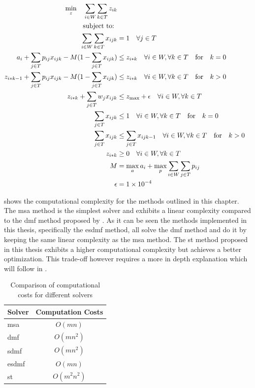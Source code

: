 \documentclass[draft=false]{seal_thesis}
\begin{document}
\begin{align}
    \min_z \quad \sum_{i \in W} \sum_{k \in T} z_{ik}\\
    \text{subject to: } \notag \\
    \sum_{i \in W} \sum_{k \in T} x_{ijk} &= 1 \quad \forall j \in T\\
    a_i + \sum_{j \in T} p_{ij} x_{ijk} - M(1 - \sum_{j \in T} x_{ijk}) &\leq z_{i*k} \quad \forall i \in W, \forall k \in T \quad \text{for} \quad k=0\\
    z_{i*k-1} + \sum_{j \in T} p_{ij} x_{ijk} - M(1 - \sum_{j \in T} x_{ijk}) &\leq z_{i*k} \quad \forall i \in W, \forall k \in T \quad \text{for} \quad k>0\\
    z_{i*k}+ \sum_{j \in T} w_j x_{ijk} &\leq z_{\text{max}} + \epsilon \quad \forall i \in W, \forall k \in T\\
    \sum_{j \in T} x_{ijk} &\leq 1 \quad \forall i \in W, \forall k \in T \quad \text{for} \quad k=0\\
    \sum_{j \in T} x_{ijk} &\leq \sum_{j \in T} x_{ijk-1} \quad \forall i \in W, \forall k \in T \quad \text{for} \quad k>0\\
    z_{i*k} &\geq 0 \quad \forall i \in W, \forall k \in T\\
    M &= \max_a a_i + \max_p \sum_{i \in W} \sum_{j \in T} p_{ij}\\
    \epsilon &= \num{1e-4}
\end{align}

 shows the computational complexity for the methods outlined in this chapter. The \gls{msa} method is the simplest solver and exhibits a linear complexity compared to the \gls{dmf} method proposed by \citet{Zeng2005}. As it can be seen the methods implemented in this thesis, specifically the \gls{esdmf} method, all solve the \gls{dmf} method and do it by keeping the same linear complexity as the \gls{msa} method. The \gls{st} method proposed in this thesis exhibits a higher computational complexity but achieves a better optimization. This trade-off however requires a more in depth explanation which will follow in .

\begin{table}[!ht]
\centering
\begin{tabular}{@{}lc@{}}
\toprule
Solver & Computation Costs \\ \midrule
\gls{msa}    & $O(mn)$           \\
\gls{dmf}   & $O(mn^2)$         \\
\gls{sdmf}  & $O(mn^2)$         \\
\gls{esdmf}  & $O(mn)$           \\
\gls{st} 	   & $O(m^2n^2)$ \\	\bottomrule
\end{tabular}
\caption{Comparison of computational costs for different solvers}
\label{tab:big_oh_solvers}
\end{table}
\end{document}
